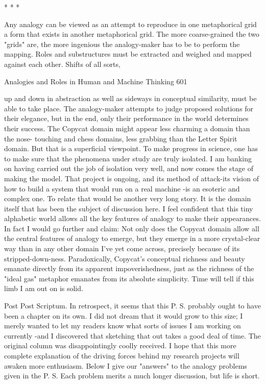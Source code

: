                                         *   *   *

        Any analogy can be viewed as an attempt to reproduce in one metaphorical
grid a form that exists in another metaphorical grid. The more coarse-grained the two
"grids" are, the more ingenious the analogy-maker has to be to perform the mapping.
Roles and substructures must be extracted and weighed and mapped against each
other. Shifts of all sorts,




Analogies and Roles in Human and Machine Thinking                                     601

up and down in abstraction as well as sideways in conceptual similarity, must be able
to take place. The analogy-maker attempts to judge proposed solutions for their
elegance, but in the end, only their performance in the world determines their success.
          The Copycat domain might appear less charming a domain than the nose-
touching and chess domains, less grabbing than the Letter Spirit domain. But that is a
superficial viewpoint. To make progress in science, one has to make sure that the
phenomena under study are truly isolated. I am banking on having carried out the job
of isolation very well, and now comes the stage of making the model. That project is
ongoing, and its method of attack-its vision of how to build a system that would run
on a real machine -is an esoteric and complex one. To relate that would be another
very long story. It is the domain itself that has been the subject of discussion here.
          I feel confident that this tiny alphabetic world allows all the key features of
analogy to make their appearances. In fact I would go further and claim: Not only
does the Copycat domain allow all the central features of analogy to emerge, but they
emerge in a more crystal-clear way than in any other domain I've yet come across,
precisely because of its stripped-down-ness. Paradoxically, Copycat's conceptual
richness and beauty emanate directly from its apparent impoverishedness, just as the
richness of the "ideal gas" metaphor emanates from its absolute simplicity. Time will
tell if this limb I am out on is solid.


Post Post Scriptum.
       In retrospect, it seems that this P. S. probably ought to have been a chapter on
its own. I did not dream that it would grow to this size; I merely wanted to let my
readers know what sorts of issues I am working on currently -and I discovered that
sketching that out takes a good deal of time. The original column was disappointingly
coolly received. I hope that this more complete explanation of the driving forces
behind my research projects will awaken more enthusiasm.
       Below I give our "answers" to the analogy problems given in the P. S. Each
problem merits a much longer discussion, but life is short.

